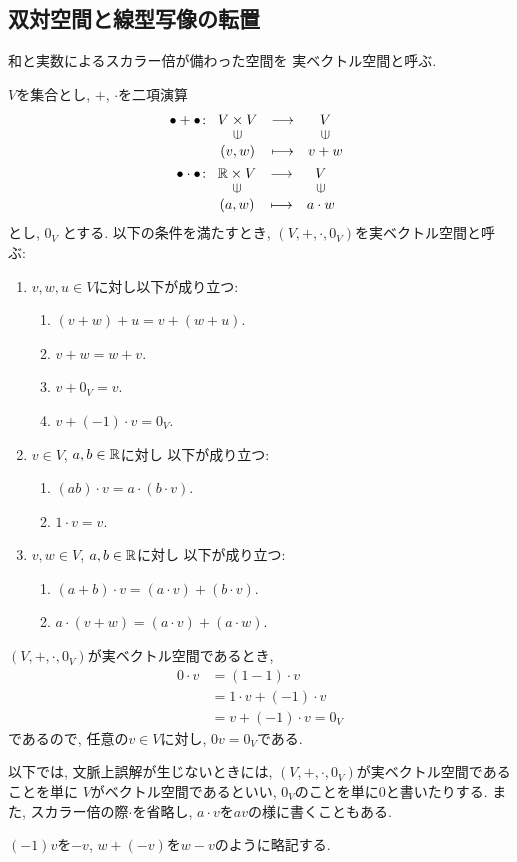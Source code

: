 \subsection{双対空間と線型写像の転置}
和と実数によるスカラー倍が備わった空間を
実ベクトル空間と呼ぶ.
\begin{definition}
  $V$を集合とし,
  $+$, $\cdot$を二項演算
  \begin{align*}
    \bullet + \bullet&\colon
    \Shazo{V\times V}{V}
          {(v,w)}{v+w}\\
    \bullet \cdot \bullet&\colon
    \Shazo{\RR\times V}{V}
          {(a,w)}{a\cdot w}
  \end{align*}
  とし,
  $0_V$
  とする.
  以下の条件を満たすとき,
  $(V,+,\cdot,0_V)$を実ベクトル空間と呼ぶ:
  \begin{enumerate}
  \item $v,w,u\in V$に対し以下が成り立つ:
    \begin{enumerate}
    \item $(v+w)+u=v+(w+u)$.
    \item $v+w=w+v$.
    \item $v+0_V=v$.
    \item $v+(-1)\cdot v=0_V$.
    \end{enumerate}
  \item $v\in V$, $a,b\in\mathbb{R}$に対し
    以下が成り立つ:
    \begin{enumerate}
    \item $(ab)\cdot v=a\cdot (b\cdot v)$.
    \item $1\cdot v=v$.
    \end{enumerate}      
  \item $v,w \in V$, $a,b\in\mathbb{R}$に対し
    以下が成り立つ:
    \begin{enumerate}
    \item $(a+b)\cdot v=(a\cdot v) + (b\cdot v)$.
    \item $a\cdot (v+w)=(a\cdot v) + (a\cdot w)$.
    \end{enumerate}      
  \end{enumerate}
\end{definition}
\begin{remark}
  $(V,+,\cdot,0_V)$が実ベクトル空間であるとき,
  \begin{align*}
    0\cdot v
    &=(1-1)\cdot v\\
    &=1\cdot v + (-1)\cdot v\\
    &=v+ (-1)\cdot v= 0_V
  \end{align*}
  であるので,
  任意の$v\in V$に対し, $0v=0_V$である.
\end{remark}
\begin{remark}
  以下では, 文脈上誤解が生じないときには,
  $(V,+,\cdot,0_V)$が実ベクトル空間であることを単に
  $V$がベクトル空間であるといい,
  $0_V$のことを単に$0$と書いたりする.
  また, スカラー倍の際$\cdot$を省略し, $a\cdot v$を$av$の様に書くこともある.
\end{remark}
\begin{remark}
  $(-1)v$を$-v$, $w+(-v)$を$w-v$のように略記する.
\end{remark}


